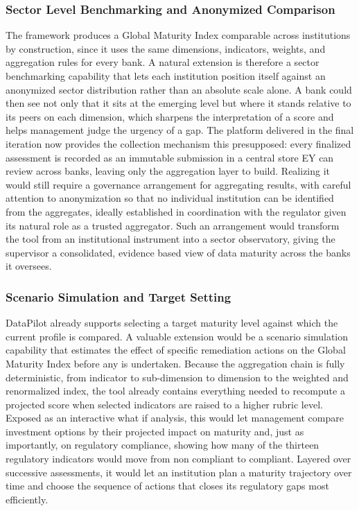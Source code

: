 \subsubsection{Sector Level Benchmarking and Anonymized Comparison}

The framework produces a Global Maturity Index comparable across institutions by construction, since it uses the same dimensions, indicators, weights, and aggregation rules for every bank. A natural extension is therefore a sector benchmarking capability that lets each institution position itself against an anonymized sector distribution rather than an absolute scale alone. A bank could then see not only that it sits at the emerging level but where it stands relative to its peers on each dimension, which sharpens the interpretation of a score and helps management judge the urgency of a gap. The platform delivered in the final iteration now provides the collection mechanism this presupposed: every finalized assessment is recorded as an immutable submission in a central store EY can review across banks, leaving only the aggregation layer to build. Realizing it would still require a governance arrangement for aggregating results, with careful attention to anonymization so that no individual institution can be identified from the aggregates, ideally established in coordination with the regulator given its natural role as a trusted aggregator. Such an arrangement would transform the tool from an institutional instrument into a sector observatory, giving the supervisor a consolidated, evidence based view of data maturity across the banks it oversees.

\subsubsection{Scenario Simulation and Target Setting}

DataPilot already supports selecting a target maturity level against which the current profile is compared. A valuable extension would be a scenario simulation capability that estimates the effect of specific remediation actions on the Global Maturity Index before any is undertaken. Because the aggregation chain is fully deterministic, from indicator to sub-dimension to dimension to the weighted and renormalized index, the tool already contains everything needed to recompute a projected score when selected indicators are raised to a higher rubric level. Exposed as an interactive what if analysis, this would let management compare investment options by their projected impact on maturity and, just as importantly, on regulatory compliance, showing how many of the thirteen regulatory indicators would move from non compliant to compliant. Layered over successive assessments, it would let an institution plan a maturity trajectory over time and choose the sequence of actions that closes its regulatory gaps most efficiently.

